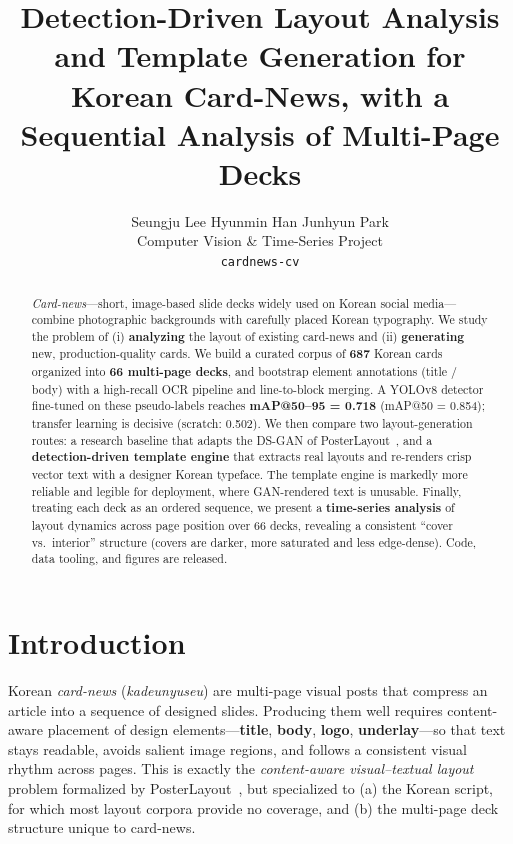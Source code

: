 \documentclass[10pt,twocolumn,letterpaper]{article}
\title{\textbf{Detection-Driven Layout Analysis and Template Generation for\\
Korean Card-News, with a Sequential Analysis of Multi-Page Decks}}
\author{Seungju Lee \quad Hyunmin Han \quad Junhyun Park\\
Computer Vision \& Time-Series Project\\
\texttt{cardnews-cv}}
\date{}
\begin{document}
\maketitle

\begin{abstract}
\emph{Card-news}---short, image-based slide decks widely used on Korean social
media---combine photographic backgrounds with carefully placed Korean
typography. We study the problem of (i) \textbf{analyzing} the layout of existing
card-news and (ii) \textbf{generating} new, production-quality cards. We build a
curated corpus of \textbf{687} Korean cards organized into \textbf{66 multi-page
decks}, and bootstrap element annotations (title / body) with a high-recall OCR
pipeline and line-to-block merging. A YOLOv8 detector fine-tuned on these
pseudo-labels reaches \textbf{mAP@50--95 = 0.718} (mAP@50 = 0.854); transfer
learning is decisive (scratch: 0.502). We then compare two layout-generation
routes: a research baseline that adapts the DS-GAN of PosterLayout~\cite{posterlayout2023},
and a \textbf{detection-driven template engine} that extracts real layouts and
re-renders crisp vector text with a designer Korean typeface. The template engine
is markedly more reliable and legible for deployment, where GAN-rendered text is
unusable. Finally, treating each deck as an ordered sequence, we present a
\textbf{time-series analysis} of layout dynamics across page position over 66
decks, revealing a consistent ``cover vs.\ interior'' structure (covers are
darker, more saturated and less edge-dense). Code, data tooling, and figures are
released.
\end{abstract}

\section{Introduction}
Korean \emph{card-news} (\emph{kadeunyuseu}) are
multi-page visual posts that compress an article into a sequence of designed
slides. Producing them well requires content-aware placement of design
elements---\textbf{title}, \textbf{body}, \textbf{logo}, \textbf{underlay}---so
that text stays readable, avoids salient image regions, and follows a consistent
visual rhythm across pages. This is exactly the \emph{content-aware
visual--textual layout} problem formalized by PosterLayout~\cite{posterlayout2023},
but specialized to (a) the Korean script, for which most layout corpora provide
no coverage, and (b) the multi-page deck structure unique to card-news.
\end{document}
